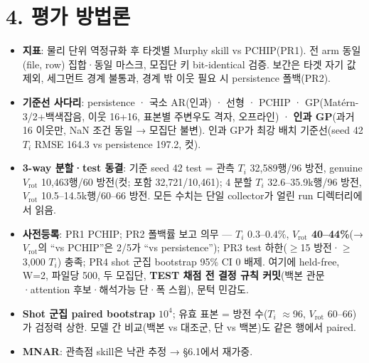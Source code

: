 \documentclass[10pt,a4paper]{article}
\newcommand{\Ti}{\ensuremath{T_i}}
\newcommand{\Vrot}{\ensuremath{V_\mathrm{rot}}}
\begin{document}
\section*{4. 평가 방법론}
\begin{itemize}
\item \textbf{지표}: 물리 단위 역정규화 후 타겟별 Murphy skill vs PCHIP(PR1). 전 arm 동일 (file, row) 집합·동일 마스크, 모집단 키 bit-identical 검증. 보간은 타겟 자기 값 제외, 세그먼트 경계 불통과, 경계 밖 이웃 필요 시 persistence 폴백(PR2).
\item \textbf{기준선 사다리}: persistence · 국소 AR(인과) · 선형 · PCHIP · GP(Matérn-3/2+백색잡음, 이웃 16+16, 표본별 주변우도 격자, 오프라인) · \textbf{인과 GP}(과거 16 이웃만, NaN 조건 동일 → 모집단 불변). 인과 GP가 최강 배치 기준선(seed 42 \Ti{} RMSE 164.3 vs persistence 197.2, 컷).
\item \textbf{3-way 분할·test 동결}: 기준 seed 42 test = 관측 \Ti{} 32,589행/96 방전, genuine \Vrot{} 10,463행/60 방전(컷; 포함 32,721/10,461); 4 분할 \Ti{} 32.6–35.9k행/96 방전, \Vrot{} 10.5–14.5k행/60–66 방전. 모든 수치는 단일 collector가 얼린 run 디렉터리에서 읽음.
\item \textbf{사전등록}: PR1 PCHIP; PR2 폴백률 보고 의무 — \Ti{} 0.3–0.4\%, \textbf{\Vrot{} 40–44\%}(→ \Vrot{}의 ``vs PCHIP''은 2/5가 ``vs persistence''); PR3 test 하한($\geq$15 방전·$\geq$3,000 \Ti) 충족; PR4 shot 군집 bootstrap 95\% CI 0 배제. 여기에 held-free, W=2, 파일당 500, 두 모집단, \textbf{TEST 채점 전 결정 규칙 커밋}(백본 관문·attention 후보·해석가능 단·폭 스윕), 문턱 민감도.
\item \textbf{Shot 군집 paired bootstrap} $10^4$; 유효 표본 = 방전 수(\Ti{} $\approx$96, \Vrot{} 60–66)가 검정력 상한. 모델 간 비교(백본 vs 대조군, 단 vs 백본)도 같은 행에서 paired.
\item \textbf{MNAR}: 관측점 skill은 낙관 추정 → \S6.1에서 재가중.
\end{itemize}
\end{document}

